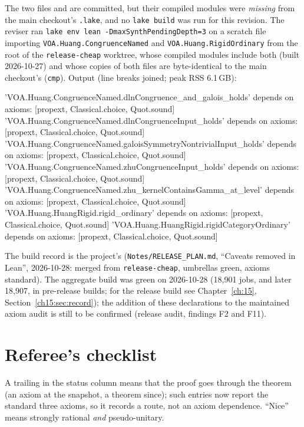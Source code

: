 The two files  and
 are committed, but their
compiled modules were \emph{missing} from the main checkout's \texttt{.lake}, and no \texttt{lake build} was run for this
revision. The reviser ran \texttt{lake env lean -DmaxSynthPendingDepth=3} on a scratch file importing
\texttt{VOA.Huang.CongruenceNamed} and \texttt{VOA.Huang.RigidOrdinary} from the root of the \texttt{release-cheap} worktree,
whose compiled modules include both (built 2026-10-27) and whose copies of both files are byte-identical to the main checkout's
(\texttt{cmp}). Output (line breaks joined; peak RSS 6.1\,GB):
\begin{plaincode}
'VOA.Huang.CongruenceNamed.dlnCongruence_and_galois_holds' depends on axioms: [propext, Classical.choice, Quot.sound]
'VOA.Huang.CongruenceNamed.dlnCongruenceInput_holds' depends on axioms: [propext, Classical.choice, Quot.sound]
'VOA.Huang.CongruenceNamed.galoisSymmetryNontrivialInput_holds' depends on axioms: [propext, Classical.choice, Quot.sound]
'VOA.Huang.CongruenceNamed.zhuCongruenceInput_holds' depends on axioms: [propext, Classical.choice, Quot.sound]
'VOA.Huang.CongruenceNamed.zhu_kernelContainsGamma_at_level' depends on axioms: [propext, Classical.choice, Quot.sound]
'VOA.Huang.HuangRigid.rigid_ordinary' depends on axioms: [propext, Classical.choice, Quot.sound]
'VOA.Huang.HuangRigid.rigidCategoryOrdinary' depends on axioms: [propext, Classical.choice, Quot.sound]
\end{plaincode}
The build record is the project's (\texttt{Notes/RELEASE\_PLAN.md}, ``Caveats removed in Lean'', 2026-10-28: merged from
\texttt{release-cheap}, umbrellas green, axioms standard). The aggregate build was green on 2026-10-28 (18{,}901 jobs, and later 18{,}907, in pre-release builds; for the release build see Chapter~\ref{ch:15}, Section~\ref{ch15:sec:record}); the
addition of these declarations to the maintained axiom audit is still to be confirmed (release audit, findings F2 and F11).

\section{Referee's checklist}\label{l21:sec:checklist}

A trailing  in the status column means that the proof goes through the theorem  (an axiom
at the snapshot, a theorem since); such entries now report the standard three axioms, so it
records a route, not an axiom dependence. ``Nice'' means strongly rational \emph{and} pseudo-unitary.

